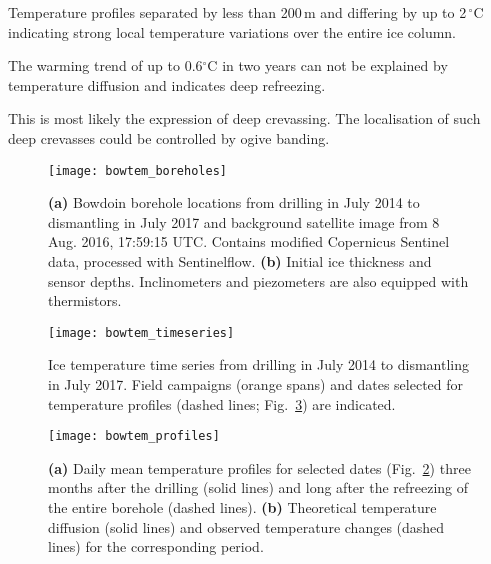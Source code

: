 \documentclass[utf8]{article}
\begin{document}
    Temperature profiles separated by less than 200\,m and differing by up to
    2\,$^\circ$C indicating strong local temperature variations over the
    entire ice column.

    The warming trend of up to 0.6$^\circ$C in two years can not be explained
    by temperature diffusion and indicates deep refreezing.

    This is most likely the expression of deep crevassing. The localisation of
    such deep crevasses could be controlled by ogive banding.


\clearpage

    \begin{figure}
      \centerline{\texttt{[image: bowtem\_boreholes]}}
      \caption{\textbf{(a)} Bowdoin borehole locations from drilling in July
               2014 to dismantling in July 2017 and background satellite
               image from 8 Aug. 2016, 17:59:15 UTC. Contains modified
               Copernicus Sentinel data, processed with Sentinelflow.
               \textbf{(b)} Initial ice thickness and sensor depths.
               Inclinometers and piezometers are also equipped with
               thermistors.}
      \label{fig:boreholes}
    \end{figure}

    \begin{figure}
      \centerline{\texttt{[image: bowtem\_timeseries]}}
      \caption{Ice temperature time series from drilling in July 2014 to
               dismantling in July 2017. Field campaigns (orange spans) and
               dates selected for temperature profiles (dashed lines;
               Fig.~\ref{fig:profiles}) are indicated.}
      \label{fig:timeseries}
    \end{figure}

    \begin{figure}
      \centerline{\texttt{[image: bowtem\_profiles]}}
      \caption{\textbf{(a)} Daily mean temperature profiles for selected dates
               (Fig.~\ref{fig:timeseries}) three months after the drilling
               (solid lines) and long after the refreezing of the entire
               borehole (dashed lines).
               \textbf{(b)} Theoretical temperature diffusion (solid lines) and
               observed temperature changes (dashed lines) for the
               corresponding period.}
      \label{fig:profiles}
    \end{figure}
\end{document}

